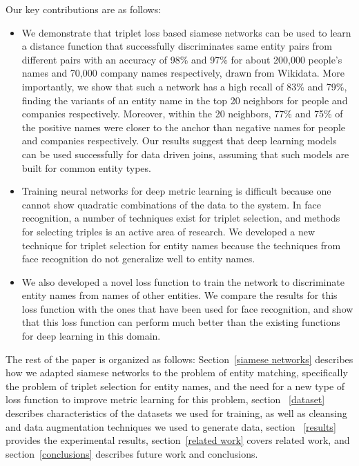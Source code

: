 Our key contributions are as follows:
\begin{itemize}
\item We demonstrate that triplet loss based siamese networks can be used to learn a distance function that successfully discriminates same entity pairs from different pairs with an accuracy of 98\% and 97\% for about 200,000 people's names and 70,000 company names respectively, drawn from Wikidata.  More importantly, we show that such a network has a high recall of 83\% and 79\%, finding the variants of an entity name in the top 20 neighbors for people and companies respectively.  Moreover, within the 20 neighbors, 77\% and 75\% of the positive names were closer to the anchor than negative names for people and companies respectively.  Our results suggest that deep learning models can be used successfully for data driven joins, assuming that such models are built for common entity types.
\item Training neural networks for deep metric learning is difficult because one cannot show quadratic combinations of the data to the system.  In face recognition, a number of techniques exist for triplet selection, and methods for selecting triples is an active area of research.  We developed a new technique for triplet selection for entity names because the techniques from face recognition do not generalize well to entity names.
\item We also developed a novel loss function to train the network to discriminate entity names from names of other entities.  We compare the results for this loss function with the ones that have been used for face recognition, and show that this loss function can perform much better than the existing functions for deep learning in this domain.
\end{itemize} 

The rest of the paper is organized as follows: Section~\ref{siamese networks} describes how we adapted siamese networks to the problem of entity matching, specifically the problem of triplet selection for entity names, and the need for a new type of loss function to improve metric learning for this problem, section ~\ref{dataset} describes characteristics of the datasets we used for training, as well as cleansing and data augmentation techniques we used to generate data, section ~\ref{results} provides the experimental results, section~\ref{related work} covers related work, and section~\ref{conclusions} describes future work and conclusions.

